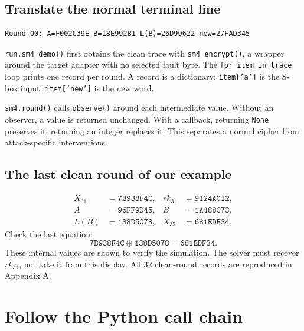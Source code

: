 \documentclass[11pt,a4paper]{report}
\newcommand{\hx}[1]{\texttt{#1}}
\newcommand{\xor}{\mathbin{\oplus}}
\begin{document}
\section{Translate the normal terminal line}
\begin{Verbatim}[numbers=none]
Round 00: A=F002C39E B=18E992B1 L(B)=26D99622 new=27FAD345
\end{Verbatim}
\texttt{run.sm4\_demo()} first obtains the clean trace with \texttt{sm4\_encrypt()}, a wrapper around the target adapter with no selected fault byte. The \texttt{for item in trace} loop prints one record per round. A record is a dictionary: \texttt{item['a']} is the S-box input; \texttt{item['new']} is the new word.

\texttt{sm4.round()} calls \texttt{observe()} around each intermediate value. Without an observer, a value is returned unchanged. With a callback, returning \texttt{None} preserves it; returning an integer replaces it. This separates a normal cipher from attack-specific interventions.

\section{The last clean round of our example}
\begin{align*}
X_{31}&=\hx{7B938F4C},&rk_{31}&=\hx{9124A012},\\
A&=\hx{96FF9D45},&B&=\hx{1A488C73},\\
L(B)&=\hx{138D5078},&X_{35}&=\hx{681EDF34}.
\end{align*}
Check the last equation:
\[\hx{7B938F4C}\xor\hx{138D5078}=\hx{681EDF34}.\]
These internal values are shown to verify the simulation. The solver must recover \(rk_{31}\), not take it from this display. All 32 clean-round records are reproduced in Appendix A.

\chapter{Follow the Python call chain}
\end{document}
